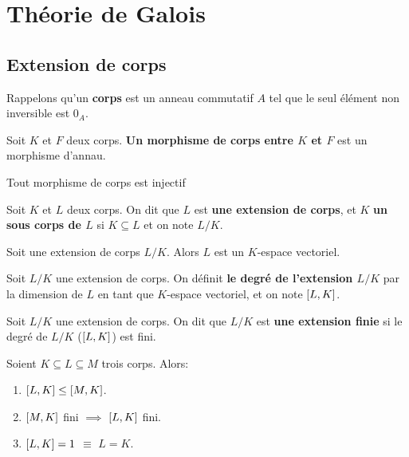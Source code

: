 \chapter{Théorie de Galois}

\section{Extension de corps}

Rappelons qu'un \textbf{corps} est un anneau commutatif $A$ tel que le seul
élément non inversible est $0_{A}$.

\begin{definition} 
	\label{def:morphisme_corps}
	Soit $K$ et $F$ deux corps. \textbf{Un morphisme de corps entre $K$ et $F$}
	est un morphisme d'annau.
\end{definition}

\begin{proposition}
	Tout morphisme de corps est injectif
\end{proposition}

\begin{definition} 
	\label{def:extension_sous_corps}
	Soit $K$ et $L$ deux corps. On dit que $L$ est \textbf{une extension de
	corps}, et $K$ \textbf{un sous corps de $L$} si $K \subseteq L$ et on note
	$L/K$.
\end{definition}

\begin{proposition}
	Soit une extension de corps $L/K$. Alors $L$ est un $K$-espace vectoriel.
\end{proposition}

\begin{definition} 
	\label{def:degre_extension}
	Soit $L/K$ une extension de corps. On définit \textbf{le degré de
	l'extension $L/K$} par la dimension de $L$ en tant que $K$-espace
	vectoriel, et on note $[L, K]$.
\end{definition}

\begin{definition} 
	Soit $L/K$ une extension de corps. On dit que $L/K$ est \textbf{une
	extension finie} si le degré de $L/K$ ($[L, K]$) est fini.
\end{definition}

\begin{remarque}
	Soient $K \subseteq L \subseteq M$ trois corps.
	Alors:
	\begin{enumerate}
		\item $[L, K] \leq [M, K]$.
		\item $[M, K]$ fini $\implies$ $[L, K]$
			fini.
		\item $[L, K] = 1$ $\equiv$ $L = K$.
	\end{enumerate}
\end{remarque}

